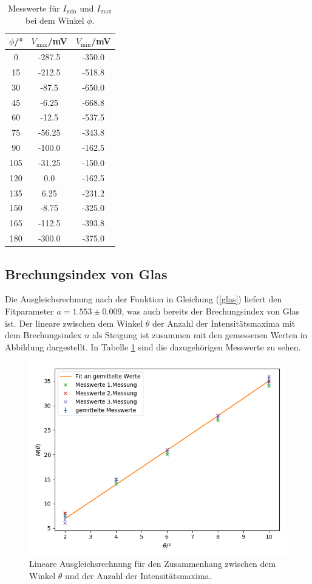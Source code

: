 \begin{table}
  \caption{Messwerte für $I_\text{min}$ und $I_\text{max}$ bei dem Winkel $\phi$.}
  \label{tab:glas}
  \centering
  \begin{tabular}{c|c|c}
    $\phi$/° & $V_\text{max}$/mV & $V_\text{min}$/mV \\ \midrule
    0 & -287.5  & -350.0 \\
    15 & -212.5 &  -518.8 \\
    30  & -87.5 & -650.0 \\
    45  & -6.25 & -668.8 \\
    60  & -12.5 & -537.5 \\
    75  & -56.25  & -343.8 \\
    90  & -100.0  & -162.5 \\
    105 & -31.25  & -150.0 \\
    120 & 0.0 & -162.5 \\
    135 & 6.25  & -231.2 \\
    150 & -8.75 & -325.0 \\
    165 & -112.5  & -393.8 \\
    180 & -300.0  & -375.0 \\
  \end{tabular}
\end{table}

\subsection{Brechungsindex von Glas}

Die Ausgleichsrechnung nach der Funktion in Gleichung (\ref{glas})
liefert den Fitparameter $a = 1.553 \pm 0.009$, was auch bereits der Brechungsindex von Glas ist.
Der lineare zwischen dem Winkel $\theta$ der Anzahl der Intensitätsmaxima mit dem Brechungsindex $n$
als Steigung ist zusammen mit den gemessenen Werten in Abbildung dargestellt. In Tabelle \ref{tab:glas}
sind die dazugehörigen Messwerte zu sehen.

\begin{figure}[h]
\centering
\includegraphics[width=\linewidth]{img/n_glas.png}
\caption{Lineare Ausgleichsrechnung für den Zusammenhang zwischen dem Winkel $\theta$ und der Anzahl
der Intensitätsmaxima.}
\label{n_glas}
\end{figure}

